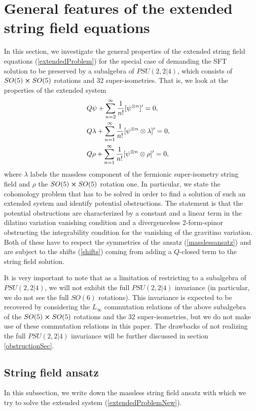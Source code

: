 \documentclass[12pt]{article}
\def\be{\begin{equation}}
\def\ee{\end{equation}}
\numberwithin{equation}{section}
\begin{document}
\section{General features of the extended string field equations}
\label{susySec}
In this section, we investigate the general properties of the extended string field equations (\ref{extendedProblem}) for the special case of demanding the SFT solution to be preserved by a subalgebra of $PSU(2,2|4)$, which consists of $SO(5) \cross SO(5)$ rotations and 32 super-isometries. That is, we look at the properties of the extended system
\be
\begin{aligned}
& Q \psi + \sum\limits_{n=2}^\infty \frac{1}{n!}[\psi^{\otimes n}]' = 0, \\
& Q \lambda + \sum_{n=1}^\infty {1\over n!} [\psi^{\otimes n}\otimes \lambda]' = 0, \\
& Q \rho + \sum_{n=1}^\infty {1\over n!} [\psi^{\otimes n}\otimes \rho]' = 0,
\label{extendedProblemNew}
\end{aligned}
\ee
where $\lambda$ labels the massless component of the fermionic super-isometry string field and $\rho$ the $SO(5) \cross SO(5)$ rotation one. In particular, we state the cohomology problem that has to be solved in order to find a solution of such an extended system and identify potential obstructions. The statement is that the potential obstructions are characterized by a constant and a linear term in the dilatino variation vanishing condition and a divergenceless 2-form-spinor obstructing the integrability condition for the vanishing of the gravitino variation. Both of these have to respect the symmetries of the ansatz (\ref{masslessansatz}) and are subject to the shifts (\ref{shifts}) coming from adding a $Q$-closed term to the string field solution.

It is very important to note that as a limitation of restricting to a subalgebra of $PSU(2,2|4)$, we will not exhibit the full $PSU(2,2|4)$ invariance (in particular, we do not see the full $SO(6)$ rotations). This invariance is expected to be recovered by considering the $L_\infty$ commutation relations of the above subalgebra of the $SO(5) \cross SO(5)$ rotations and the 32 super-isometries, but we do not make use of these commutation relations in this paper. The drawbacks of not realizing the full $PSU(2,2|4)$ invariance will be further discussed in section \ref{obstructionSec}.

\subsection{String field ansatz}
In this subsection, we write down the massless string field ansatz with which we try to solve the extended system (\ref{extendedProblemNew}).
\end{document}
